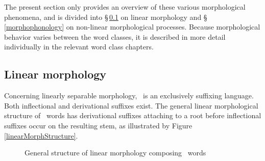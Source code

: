 The present section only provides an overview of these various morphological phenomena, and is divided into §\,\ref{linearMorphology} on linear morphology and §\,\ref{morphophonology} on non-linear morphological processes. %
Because morphological behavior varies between the word classes, it is described in more detail individually in the relevant word class chapters.  


\subsection{Linear morphology}\label{linearMorphology}
Concerning linearly separable morphology, \PS\ is an exclusively suffixing language. Both inflectional and derivational suffixes exist. %
The general linear morphological structure of \PS\ words has derivational suffixes attaching to a root before inflectional suffixes occur on the resulting stem, as illustrated by Figure \vref{linearMorphStructure}.
\begin{figure}
\caption{General structure of linear morphology composing \PS\ words}\label{linearMorphStructure}
\end{figure}

%


